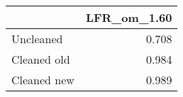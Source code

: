 \begin{tabular}{lr}
\toprule
{} & LFR_om_1.60 \\
\midrule
Uncleaned   &       0.708 \\
Cleaned old &       0.984 \\
Cleaned new &       0.989 \\
\bottomrule
\end{tabular}
